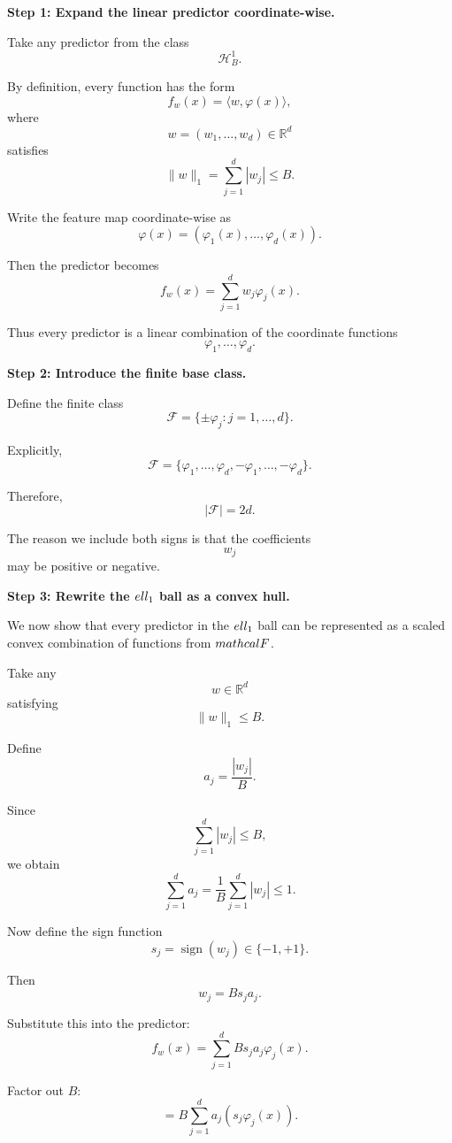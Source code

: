 \documentclass[11pt]{article}
\newcommand{\R}{\mathbb{R}}
\begin{document}
\begin{enumerate}
\begin{solutionbox}
\medskip

\textbf{Step 1: Expand the linear predictor coordinate-wise.}

Take any predictor from the class
\[
\mathcal H_B^1.
\]

By definition, every function has the form
\[
f_w(x)
=
\langle w,\varphi(x)\rangle,
\]
where
\[
w=(w_1,\ldots,w_d)\in\R^d
\]
satisfies
\[
\|w\|_1
=
\sum_{j=1}^d|w_j|
\le B.
\]

Write the feature map coordinate-wise as
\[
\varphi(x)
=
(\varphi_1(x),\ldots,\varphi_d(x)).
\]

Then the predictor becomes
\[
f_w(x)
=
\sum_{j=1}^d
w_j\varphi_j(x).
\]

Thus every predictor is a linear combination of the coordinate functions
\[
\varphi_1,\ldots,\varphi_d.
\]

\medskip

\textbf{Step 2: Introduce the finite base class.}

Define the finite class
\[
\mathcal F
=
\{
\pm\varphi_j :
j=1,\ldots,d
\}.
\]

Explicitly,
\[
\mathcal F
=
\{
\varphi_1,\ldots,\varphi_d,
-\varphi_1,\ldots,-\varphi_d
\}.
\]

Therefore,
\[
|\mathcal F|=2d.
\]

The reason we include both signs is that the coefficients
\[
w_j
\]
may be positive or negative.

\medskip

\textbf{Step 3: Rewrite the $\\ell_1$ ball as a convex hull.}

We now show that every predictor in the $\\ell_1$ ball can be represented as a scaled convex combination of functions from $\\mathcal F$.

Take any
\[
w\in\R^d
\]
satisfying
\[
\|w\|_1\le B.
\]

Define
\[
a_j=\frac{|w_j|}{B}.
\]

Since
\[
\sum_{j=1}^d|w_j|
\le B,
\]
we obtain
\[
\sum_{j=1}^da_j
=
\frac1B\sum_{j=1}^d|w_j|
\le1.
\]

Now define the sign function
\[
s_j=\operatorname{sign}(w_j)\in\{-1,+1\}.
\]

Then
\[
w_j
=
Bs_ja_j.
\]

Substitute this into the predictor:
\[
f_w(x)
=
\sum_{j=1}^d
Bs_ja_j\varphi_j(x).
\]

Factor out $B$:
\[
=
B
\sum_{j=1}^d
a_j(s_j\varphi_j(x)).
\]


\end{solutionbox}
\end{enumerate}
\end{document}
